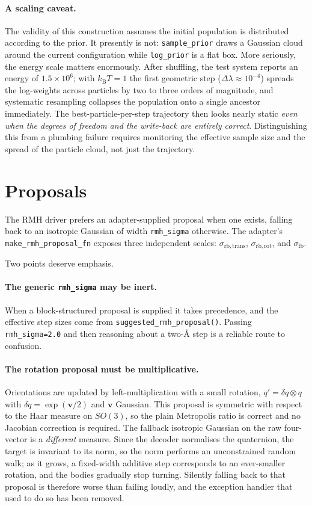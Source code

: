\documentclass[11pt]{article}
\newcommand{\code}[1]{\texttt{#1}}
\begin{document}
\paragraph{A scaling caveat.}
The validity of this construction assumes the initial population is distributed
according to the prior. It presently is not: \code{sample\_prior} draws a
Gaussian cloud around the current configuration while \code{log\_prior} is a
flat box. More seriously, the energy scale matters enormously. After shuffling,
the test system reports an energy of $1.5\times10^6$; with $k_{\mathrm{B}}T=1$
the first geometric step ($\Delta\lambda \approx 10^{-4}$) spreads the
log-weights across particles by two to three orders of magnitude, and systematic
resampling collapses the population onto a single ancestor immediately. The
best-particle-per-step trajectory then looks nearly static \emph{even when the
degrees of freedom and the write-back are entirely correct}. Distinguishing this
from a plumbing failure requires monitoring the effective sample size and the
spread of the particle cloud, not just the trajectory.

\section{Proposals}

The RMH driver prefers an adapter-supplied proposal when one exists, falling
back to an isotropic Gaussian of width \code{rmh\_sigma} otherwise. The
adapter's \code{make\_rmh\_proposal\_fn} exposes three independent scales:
$\sigma_{\mathrm{rb,trans}}$, $\sigma_{\mathrm{rb,rot}}$, and
$\sigma_{\mathrm{fb}}$.

Two points deserve emphasis.

\paragraph{The generic \code{rmh\_sigma} may be inert.}
When a block-structured proposal is supplied it takes precedence, and the
effective step sizes come from \code{suggested\_rmh\_proposal()}. Passing
\code{rmh\_sigma=2.0} and then reasoning about a two-\AA{} step is a reliable
route to confusion.

\paragraph{The rotation proposal must be multiplicative.}
Orientations are updated by left-multiplication with a small rotation,
$q' = \delta q \otimes q$ with $\delta q = \exp(\mathbf{v}/2)$ and $\mathbf{v}$
Gaussian. This proposal is symmetric with respect to the Haar measure on
$SO(3)$, so the plain Metropolis ratio is correct and no Jacobian correction is
required. The fallback isotropic Gaussian on the raw four-vector is a
\emph{different} measure. Since the decoder normalises the quaternion, the
target is invariant to its norm, so the norm performs an unconstrained random
walk; as it grows, a fixed-width additive step corresponds to an ever-smaller
rotation, and the bodies gradually stop turning. Silently falling back to that
proposal is therefore worse than failing loudly, and the exception handler that
used to do so has been removed.
\end{document}
